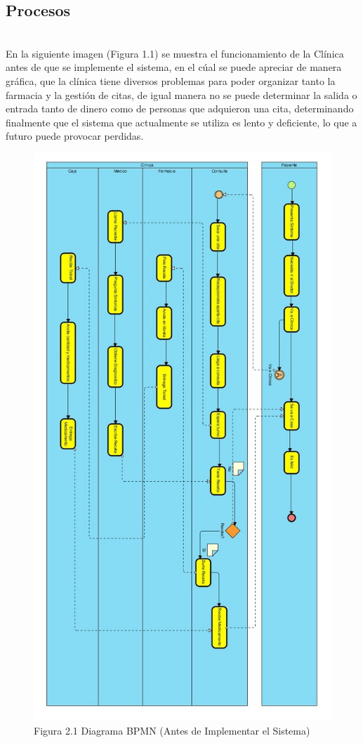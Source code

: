 \subsection{Procesos}
\\ 
En la siguiente imagen (Figura 1.1) se muestra el funcionamiento de la Cl\'inica antes de que se implemente el sistema, en el c\'ual se puede apreciar de manera gr\'afica, que la cl\'inica tiene diversos problemas para poder organizar tanto la farmacia y la gesti\'on de citas, de igual manera no se puede determinar la salida o entrada tanto de dinero como de personas que adquieron una cita, determinando finalmente que el sistema que actualmente se utiliza es lento y deficiente, lo que a futuro puede provocar perdidas.
\begin{figure}[htbp!]
\centering
		\includegraphics[width=.75\textwidth]{images/bpm1}
		\caption{Figura 2.1 Diagrama BPMN (Antes de Implementar el Sistema)}
	\end{figure}
\newpage
	
